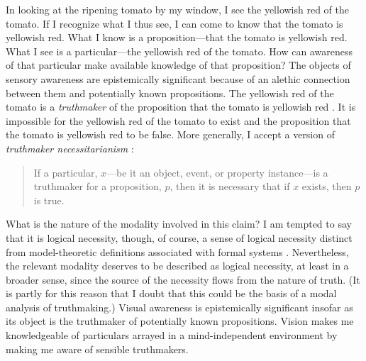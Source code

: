 \documentclass[12pt]{article}
\begin{document}
In looking at the ripening tomato by my window, I see the yellowish red of the tomato. If I recognize what I thus see, I can come to know that the tomato is yellowish red. What I know is a proposition---that the tomato is yellowish red. What I see is a particular---the yellowish red of the tomato. How can awareness of that particular make available knowledge of that proposition? The objects of sensory awareness are epistemically significant because of an alethic connection between them and potentially known propositions. The yellowish red of the tomato is a \emph{truthmaker} of the proposition that the tomato is yellowish red \citep[see][]{Johnston:2006uq}. It is impossible for the yellowish red of the tomato to exist and the proposition that the tomato is yellowish red to be false. More generally, I accept a version of \emph{truthmaker necessitarianism} \citep[for a survey of recent work on truthmakers see][]{Rodriguez-Pereyra:2006fk}:
\begin{quote}
	If a particular, \( x \)---be it an object, event, or property instance---is a truthmaker for a proposition, \( p \), then it is necessary that if \( x \) exists, then \( p \) is true. 
\end{quote}
What is the nature of the modality involved in this claim? I am tempted to say that it is logical necessity, though, of course, a sense of logical necessity distinct from model-theoretic definitions associated with formal systems  \citep[for doubts about model-theoretic definitions of logical necessity see][]{Etchemendy:1988et,Etchemendy:1988sa}. Nevertheless, the relevant modality deserves to be described as logical necessity, at least in a broader sense, since the source of the necessity flows from the nature of truth. (It is partly for this reason that I doubt that this could be the basis of a modal analysis of truthmaking.) Visual awareness is epistemically significant insofar as its object is the truthmaker of potentially known propositions. Vision makes me knowledgeable of particulars arrayed in a mind-independent environment by making me aware of sensible truthmakers.
\end{document}
